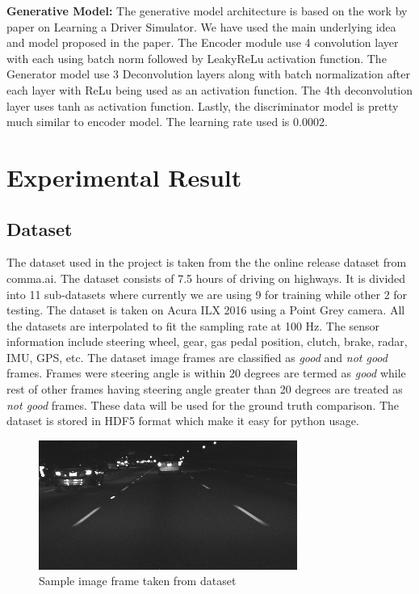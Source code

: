 \documentclass[a4paper,11pt,titlepage,drop]{article}%
\begin{document}
\textbf{Generative Model:} The generative model architecture is based on the work by  paper on Learning a Driver Simulator. We have used the main underlying idea and model proposed in the paper. The Encoder module use 4 convolution layer with each using batch norm followed by LeakyReLu activation function. The Generator model use 3 Deconvolution layers along with batch normalization after each layer with ReLu being used as an activation function. The 4th deconvolution layer uses tanh as activation function. Lastly, the discriminator model is pretty much similar to encoder model. The learning rate used is 0.0002.






\section{Experimental Result}
\subsection{Dataset}
The dataset  used in the project is taken from the the online release dataset from comma.ai. The dataset consists of 7.5 hours of driving on highways. It is divided into 11 sub-datasets where currently we are using 9 for training while other 2 for testing. The dataset is taken on Acura ILX 2016 using a Point Grey camera. All the datasets are interpolated to fit the sampling rate at 100 Hz. The sensor information include steering wheel, gear, gas pedal position, clutch, brake, radar, IMU, GPS, etc. The dataset image frames are classified as \emph{good} and \emph{not good} frames. Frames were steering angle is within 20 degrees are termed as \emph{good} while rest of other frames having steering angle greater than 20 degrees are treated as \emph{not good} frames. These data will be used for the ground truth comparison. The dataset is stored in HDF5 format which make it easy for python usage.

\begin{figure}
    \center
    \includegraphics[width=\textwidth]{image}
    \caption{Sample image frame taken from dataset}
    \label{fig:figure6}
\end{figure} 
\end{document}
